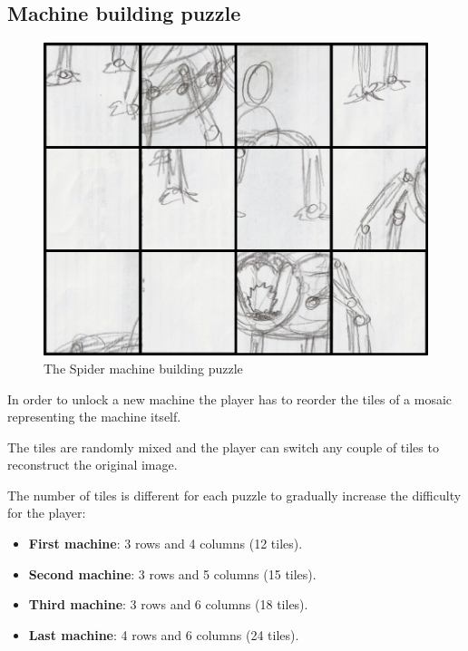 \subsection{Machine building puzzle}
\begin{figure}[H]
  \centering
  \includegraphics[width=\textwidth]{Images/Puzzles/castleOfDynamia1}
  \caption{The Spider machine building puzzle}
\end{figure}

In order to unlock a new machine the player has to reorder the tiles of a mosaic representing the machine itself.

The tiles are randomly mixed and the player can switch any couple of tiles to reconstruct the original image.

The number of tiles is different for each puzzle to gradually increase the difficulty for the player:
\begin{itemize}
	\item \textbf{First machine}: 3 rows and 4 columns (12 tiles).
	\item \textbf{Second machine}: 3 rows and 5 columns (15 tiles).
	\item \textbf{Third machine}: 3 rows and 6 columns (18 tiles).
	\item \textbf{Last machine}: 4 rows and 6 columns (24 tiles).
\end{itemize}

